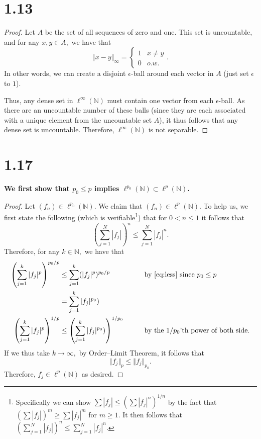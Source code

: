 \documentclass[10pt]{article}
\begin{document}
\section*{1.13}

\begin{proof}
    Let $A$ be the set of all sequences of zero and one. This set is uncountable, and for any $x,y \in A,$ we have that
    \begin{equation*}
        \Vert x-y\Vert_\infty = \begin{cases}
            1 & x\neq y\\
            0 & o.w.
        \end{cases}.
    \end{equation*}
    In other words, we can create a disjoint $\epsilon$-ball around each vector in $A$ (just set $\epsilon$ to $1$).

    Thus, any dense set in $\ell^\infty(\mathbb{N})$ must contain one vector from each $\epsilon$-ball. As there are an uncountable number of these balls (since they are each associated with a unique element from the uncountable set $A$), it thus follows that any dense set is uncountable. Therefore, $\ell^\infty(\mathbb{N})$ is not separable.
\end{proof}

\section*{1.17}

\textbf{We first show that $p_0 \le p$ implies $\ell^{p_0}(\mathbb{N})\subset \ell^{p}(\mathbb{N})$.}


\begin{proof}
    Let $(f_n) \in \ell^{p_0}(\mathbb{N}).$ We claim that $(f_n) \in \ell^{p}(\mathbb{N}).$ To help us, we first state the following (which is verifiable\footnote{Specifically we can show $\sum |f_j| \le (\sum |f_j|^n)^{1/n}$ by the fact that $(\sum |f_j|)^m \ge \sum |f_j|^m$ for $m\ge 1$. It then follows that $\left( \sum_{j=1}^{N} |f_j|\right )^n \le \sum_{j=1}^{N}|f_j|^n.$}) that for $0<n\le 1$ it follows that
    \begin{equation} \label{eq:less}
        \left( \sum_{j=1}^{N} |f_j|\right )^n \le \sum_{j=1}^{N}|f_j|^n.
    \end{equation}
    Therefore, for any $k\in\mathbb{N},$ we have that
    \begin{alignat}{2}
        \left(\sum_{j=1}^{k}|f_j|^p\right)^{p_0/p} &\le \sum_{j=1}^{k} (|f_j|^p)^{p_0/p} && \text{by \eqref{eq:less} since $p_0\le p$}\nonumber\\
        &= \sum_{j=1}^{k} |f_j|^{p_0})\nonumber\\
        \left(\sum_{j=1}^{k}|f_j|^p\right)^{1/p} &\le \left(\sum_{j=1}^{k} |f_j|^{p_0})\right)^{1/p_0} \qquad&& \text{by the $1/p_0$'th power of both side.} \label{eq:prevp}
    \end{alignat}
    If we thus take $k\to\infty,$ by Order--Limit Theorem, it follows that
    \[\Vert f_j\Vert_p \le \Vert f_j \Vert_{p_0}.\]
    Therefore, $f_j \in \ell^p(\mathbb{N})$ as desired.
\end{proof}
\end{document}
